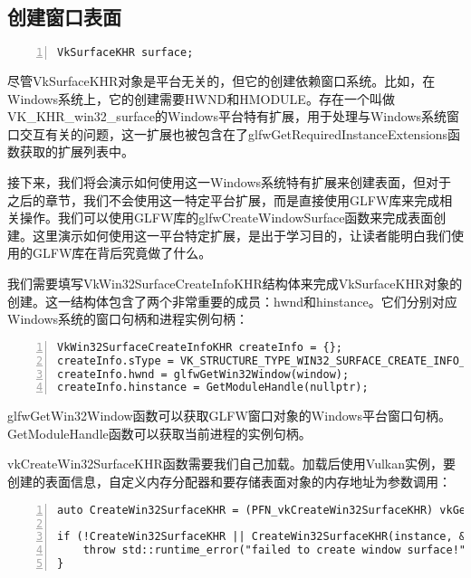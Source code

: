 \documentclass{ctexart}
\begin{document}
\subsection{创建窗口表面}

\begin{lstlisting}[language={[ANSI]C},keywordstyle=\color{blue!70},commentstyle=\color{red!50!green!50!blue!50},frame=shadowbox, rulesepcolor=\color{red!20!green!20!blue!20},basicstyle=\small,numbers=left, numberstyle=\tiny,breaklines=true]
VkSurfaceKHR surface;
\end{lstlisting}

尽管VkSurfaceKHR对象是平台无关的，但它的创建依赖窗口系统。比如，在Windows系统上，它的创建需要HWND和HMODULE。存在一个叫做VK\_KHR\_win32\_surface的Windows平台特有扩展，用于处理与Windows系统窗口交互有关的问题，这一扩展也被包含在了glfwGetRequiredInstanceExtensions函数获取的扩展列表中。

接下来，我们将会演示如何使用这一Windows系统特有扩展来创建表面，但对于之后的章节，我们不会使用这一特定平台扩展，而是直接使用GLFW库来完成相关操作。我们可以使用GLFW库的glfwCreateWindowSurface函数来完成表面创建。这里演示如何使用这一平台特定扩展，是出于学习目的，让读者能明白我们使用的GLFW库在背后究竟做了什么。

我们需要填写VkWin32SurfaceCreateInfoKHR结构体来完成VkSurfaceKHR对象的创建。这一结构体包含了两个非常重要的成员：hwnd和hinstance。它们分别对应Windows系统的窗口句柄和进程实例句柄：

\begin{lstlisting}[language={[ANSI]C},keywordstyle=\color{blue!70},commentstyle=\color{red!50!green!50!blue!50},frame=shadowbox, rulesepcolor=\color{red!20!green!20!blue!20},basicstyle=\small,numbers=left, numberstyle=\tiny,breaklines=true]
VkWin32SurfaceCreateInfoKHR createInfo = {};
createInfo.sType = VK_STRUCTURE_TYPE_WIN32_SURFACE_CREATE_INFO_KHR;
createInfo.hwnd = glfwGetWin32Window(window);
createInfo.hinstance = GetModuleHandle(nullptr);
\end{lstlisting}

glfwGetWin32Window函数可以获取GLFW窗口对象的Windows平台窗口句柄。GetModuleHandle函数可以获取当前进程的实例句柄。

vkCreateWin32SurfaceKHR函数需要我们自己加载。加载后使用Vulkan实例，要创建的表面信息，自定义内存分配器和要存储表面对象的内存地址为参数调用：

\begin{lstlisting}[language={[ANSI]C},keywordstyle=\color{blue!70},commentstyle=\color{red!50!green!50!blue!50},frame=shadowbox, rulesepcolor=\color{red!20!green!20!blue!20},basicstyle=\small,numbers=left, numberstyle=\tiny,breaklines=true]
auto CreateWin32SurfaceKHR = (PFN_vkCreateWin32SurfaceKHR) vkGetInstanceProcAddr(instance, "vkCreateWin32SurfaceKHR");

if (!CreateWin32SurfaceKHR || CreateWin32SurfaceKHR(instance, &createInfo, nullptr, &surface) != VK_SUCCESS) {
	throw std::runtime_error("failed to create window surface!");
}
\end{lstlisting}
\end{document}
